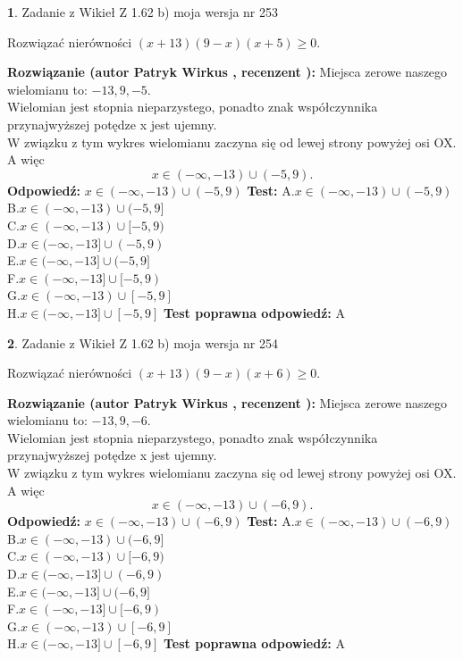 \documentclass[12pt, a4paper]{article}
\theoremstyle{definition} %
\newtheorem{zad}{}
\newcommand{\zadStart}[1]{\begin{zad}#1\newline}
\newcommand{\zadStop}{\end{zad}}
\newcommand{\rozwStart}[2]{\noindent \textbf{Rozwiązanie (autor #1 , recenzent #2): }\newline}
\newcommand{\rozwStop}{\newline}
\newcommand{\odpStart}{\noindent \textbf{Odpowiedź:}\newline}
\newcommand{\odpStop}{\newline}
\newcommand{\testStart}{\noindent \textbf{Test:}\newline}
\newcommand{\testStop}{\newline}
\newcommand{\kluczStart}{\noindent \textbf{Test poprawna odpowiedź:}\newline}
\newcommand{\kluczStop}{\newline}
\begin{document}
\zadStart{Zadanie z Wikieł Z 1.62 b) moja wersja nr 253}

Rozwiązać nierówności $(x+13)(9-x)(x+5)\ge0$.
\zadStop
\rozwStart{Patryk Wirkus}{}
Miejsca zerowe naszego wielomianu to: $-13, 9, -5$.\\
Wielomian jest stopnia nieparzystego, ponadto znak współczynnika przy\linebreak najwyższej potędze x jest ujemny.\\ W związku z tym wykres wielomianu zaczyna się od lewej strony powyżej osi OX. A więc $$x \in (-\infty,-13) \cup (-5,9).$$
\rozwStop
\odpStart
$x \in (-\infty,-13) \cup (-5,9)$
\odpStop
\testStart
A.$x \in (-\infty,-13) \cup (-5,9)$\\
B.$x \in (-\infty,-13) \cup (-5,9]$\\
C.$x \in (-\infty,-13) \cup [-5,9)$\\
D.$x \in (-\infty,-13] \cup (-5,9)$\\
E.$x \in (-\infty,-13] \cup (-5,9]$\\
F.$x \in (-\infty,-13] \cup [-5,9)$\\
G.$x \in (-\infty,-13) \cup [-5,9]$\\
H.$x \in (-\infty,-13] \cup [-5,9]$
\testStop
\kluczStart
A
\kluczStop



\zadStart{Zadanie z Wikieł Z 1.62 b) moja wersja nr 254}

Rozwiązać nierówności $(x+13)(9-x)(x+6)\ge0$.
\zadStop
\rozwStart{Patryk Wirkus}{}
Miejsca zerowe naszego wielomianu to: $-13, 9, -6$.\\
Wielomian jest stopnia nieparzystego, ponadto znak współczynnika przy\linebreak najwyższej potędze x jest ujemny.\\ W związku z tym wykres wielomianu zaczyna się od lewej strony powyżej osi OX. A więc $$x \in (-\infty,-13) \cup (-6,9).$$
\rozwStop
\odpStart
$x \in (-\infty,-13) \cup (-6,9)$
\odpStop
\testStart
A.$x \in (-\infty,-13) \cup (-6,9)$\\
B.$x \in (-\infty,-13) \cup (-6,9]$\\
C.$x \in (-\infty,-13) \cup [-6,9)$\\
D.$x \in (-\infty,-13] \cup (-6,9)$\\
E.$x \in (-\infty,-13] \cup (-6,9]$\\
F.$x \in (-\infty,-13] \cup [-6,9)$\\
G.$x \in (-\infty,-13) \cup [-6,9]$\\
H.$x \in (-\infty,-13] \cup [-6,9]$
\testStop
\kluczStart
A
\kluczStop
\end{document}

